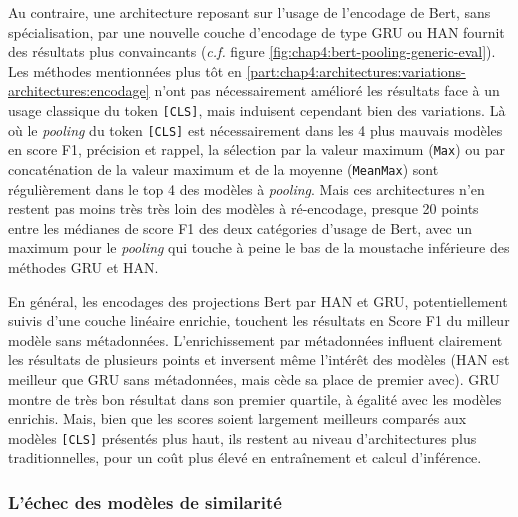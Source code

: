 Au contraire, une architecture reposant sur l'usage de l'encodage de Bert, sans spécialisation, par une nouvelle couche d'encodage de type GRU ou HAN fournit des résultats plus convaincants (\textit{c.f.} figure \ref{fig:chap4:bert-pooling-generic-eval}). Les méthodes mentionnées plus tôt en \ref{part:chap4:architectures:variations-architectures:encodage} n'ont pas nécessairement amélioré les résultats face à un usage classique du token \texttt{[CLS]}, mais induisent cependant bien des variations. Là où le \textit{pooling} du token \texttt{[CLS]} est nécessairement dans les 4 plus mauvais modèles en score F1, précision et rappel, la sélection par la valeur maximum (\texttt{Max}) ou par concaténation de la valeur maximum et de la moyenne (\texttt{MeanMax}) sont régulièrement dans le top 4 des modèles à \textit{pooling}. Mais ces architectures n'en restent pas moins très très loin des modèles à ré-encodage, presque 20 points entre les médianes de score F1 des deux catégories d'usage de Bert, avec un maximum pour le \textit{pooling} qui touche à peine le bas de la moustache inférieure des méthodes GRU et HAN.

En général, les encodages des projections Bert par HAN et GRU, potentiellement suivis d'une couche linéaire enrichie, touchent les résultats en Score F1 du milleur modèle sans métadonnées. L'enrichissement par métadonnées influent clairement les résultats de plusieurs points et inversent même l'intérêt des modèles (HAN est meilleur que GRU sans métadonnées, mais cède sa place de premier avec). GRU montre de très bon résultat dans son premier quartile, à égalité avec les modèles enrichis. Mais, bien que les scores soient largement meilleurs comparés aux modèles \texttt{[CLS]} présentés plus haut, ils restent au niveau d'architectures plus traditionnelles, pour un coût plus élevé en entraînement et calcul d'inférence.

\subsubsection{L’échec des modèles de similarité}

